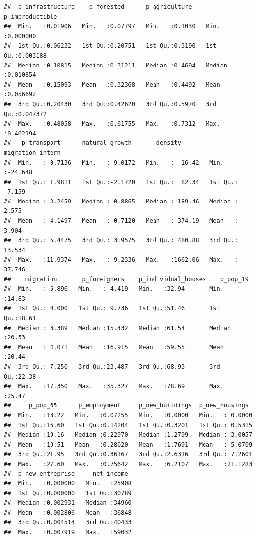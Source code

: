 \documentclass[
]{article}
\begin{document}
\begin{verbatim}
##  p_infrastructure    p_forested      p_agriculture    p_improductible   
##  Min.   :0.01906   Min.   :0.07797   Min.   :0.1030   Min.   :0.000000  
##  1st Qu.:0.06232   1st Qu.:0.20751   1st Qu.:0.3190   1st Qu.:0.003188  
##  Median :0.10815   Median :0.31211   Median :0.4694   Median :0.010854  
##  Mean   :0.15093   Mean   :0.32368   Mean   :0.4492   Mean   :0.056692  
##  3rd Qu.:0.20430   3rd Qu.:0.42620   3rd Qu.:0.5970   3rd Qu.:0.047372  
##  Max.   :0.48058   Max.   :0.61755   Max.   :0.7312   Max.   :0.402194  
##   p_transport      natural_growth       density        migration_intern 
##  Min.   : 0.7136   Min.   :-9.0172   Min.   :  16.42   Min.   :-24.648  
##  1st Qu.: 1.9811   1st Qu.:-2.1720   1st Qu.:  82.34   1st Qu.: -7.159  
##  Median : 3.2459   Median : 0.8865   Median : 189.46   Median :  2.575  
##  Mean   : 4.1497   Mean   : 0.7120   Mean   : 374.19   Mean   :  3.904  
##  3rd Qu.: 5.4475   3rd Qu.: 3.9575   3rd Qu.: 480.88   3rd Qu.: 13.534  
##  Max.   :11.9374   Max.   : 9.2336   Max.   :1662.06   Max.   : 37.746  
##    migration       p_foreigners    p_individual_houses    p_pop_19    
##  Min.   :-5.896   Min.   : 4.419   Min.   :32.94       Min.   :14.83  
##  1st Qu.: 0.000   1st Qu.: 9.736   1st Qu.:51.46       1st Qu.:18.61  
##  Median : 3.389   Median :15.432   Median :61.54       Median :20.53  
##  Mean   : 4.071   Mean   :16.915   Mean   :59.55       Mean   :20.44  
##  3rd Qu.: 7.250   3rd Qu.:23.487   3rd Qu.:68.93       3rd Qu.:22.38  
##  Max.   :17.350   Max.   :35.327   Max.   :78.69       Max.   :25.47  
##     p_pop_65      p_employment     p_new_buildings  p_new_housings   
##  Min.   :13.22   Min.   :0.07255   Min.   :0.0000   Min.   : 0.0000  
##  1st Qu.:16.60   1st Qu.:0.14204   1st Qu.:0.3201   1st Qu.: 0.5315  
##  Median :19.16   Median :0.22970   Median :1.2799   Median : 3.0057  
##  Mean   :19.51   Mean   :0.28020   Mean   :1.7691   Mean   : 5.0709  
##  3rd Qu.:21.95   3rd Qu.:0.36167   3rd Qu.:2.6316   3rd Qu.: 7.2601  
##  Max.   :27.60   Max.   :0.75642   Max.   :6.2107   Max.   :21.1283  
##  p_new_entreprise     net_income   
##  Min.   :0.000000   Min.   :25908  
##  1st Qu.:0.000000   1st Qu.:30789  
##  Median :0.002931   Median :34960  
##  Mean   :0.002806   Mean   :36848  
##  3rd Qu.:0.004514   3rd Qu.:40433  
##  Max.   :0.007919   Max.   :59032
\end{verbatim}
\end{document}
